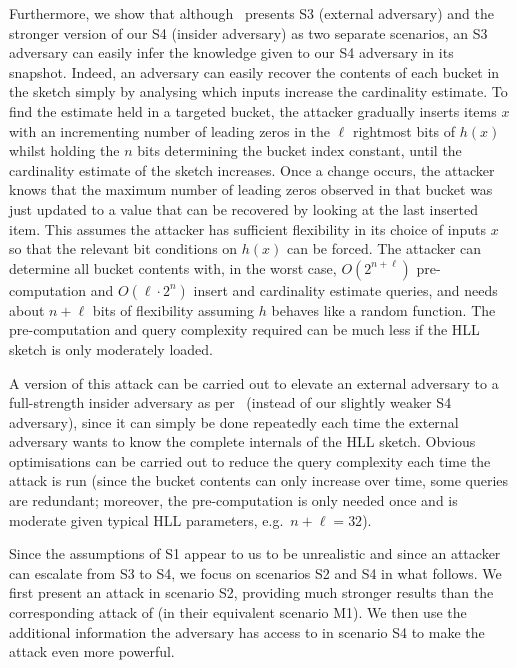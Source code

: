 \documentclass{IEEEtran}
\begin{document}
Furthermore, we show that although~\cite{cardestprivacy} presents S3 (external adversary) and the stronger version of our S4 (insider adversary) as two separate scenarios, an S3 adversary can easily infer the knowledge given to our S4 adversary in its snapshot. Indeed, an adversary can easily recover the contents of each bucket in the sketch simply by analysing which inputs increase the cardinality estimate. To find the estimate held in a targeted bucket, the attacker gradually inserts items $x$ with an incrementing number of leading zeros in the $\ell$ rightmost bits of $h(x)$ whilst holding the $n$ bits determining the bucket index constant, until the cardinality estimate of the sketch increases. Once a change occurs, the attacker knows that the maximum number of leading zeros observed in that bucket was just updated to a value that can be recovered by looking at the last inserted item. This assumes the attacker has sufficient flexibility in its choice of inputs $x$ so that the relevant bit conditions on $h(x)$ can be forced. The attacker can determine all bucket contents with, in the worst case, $O(2^{n + \ell})$ pre-computation and $O(\ell \cdot 2^{n})$ insert and cardinality estimate queries, and needs about $n + \ell$ bits of flexibility assuming $h$ behaves like a random function. The pre-computation and query complexity required can be much less if the HLL sketch is only moderately loaded.

A version of this attack can be carried out to elevate an external adversary to a full-strength insider adversary as per~\cite{cardestprivacy} (instead of our slightly weaker S4 adversary), since it can simply be done repeatedly each time the external adversary wants to know the complete internals of the HLL sketch. Obvious optimisations can be carried out to reduce the query complexity each time the attack is run (since the bucket contents can only increase over time, some queries are redundant; moreover, the pre-computation is only needed once and is moderate given typical HLL parameters, e.g.\ $n+\ell = 32$).

Since the assumptions of S1 appear to us to be unrealistic and since an attacker can escalate from S3 to S4, we focus on scenarios S2 and S4 in what follows. We first present an attack in scenario S2, providing much stronger results than the corresponding attack of \cite{hllvuln} (in their equivalent scenario M1). We then use the additional information the adversary has access to in scenario S4 to make the attack even more powerful.
\end{document}
